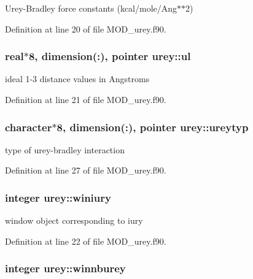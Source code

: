 Urey-\/\-Bradley force constants (kcal/mole/\-Ang$\ast$$\ast$2) 



Definition at line 20 of file M\-O\-D\-\_\-urey.\-f90.

\hypertarget{classurey_a25d40d37004ea0056782407850a7f9e6}{
\subsubsection[{ul}]{\setlength{\rightskip}{0pt plus 5cm}real$\ast$8, dimension(\-:), pointer urey\-::ul}}\label{classurey_a25d40d37004ea0056782407850a7f9e6}


ideal 1-\/3 distance values in Angstroms 



Definition at line 21 of file M\-O\-D\-\_\-urey.\-f90.

\hypertarget{classurey_a2b42e1fe25c411e3bf60b0fbba5471c0}{
\subsubsection[{ureytyp}]{\setlength{\rightskip}{0pt plus 5cm}character$\ast$8, dimension(\-:), pointer urey\-::ureytyp}}\label{classurey_a2b42e1fe25c411e3bf60b0fbba5471c0}


type of urey-\/bradley interaction 



Definition at line 27 of file M\-O\-D\-\_\-urey.\-f90.

\hypertarget{classurey_a06f6e3c501f1deefacf31961bcdf92ad}{
\subsubsection[{winiury}]{\setlength{\rightskip}{0pt plus 5cm}integer urey\-::winiury}}\label{classurey_a06f6e3c501f1deefacf31961bcdf92ad}


window object corresponding to iury 



Definition at line 22 of file M\-O\-D\-\_\-urey.\-f90.

\hypertarget{classurey_a6e00dbd3a8fa551480df4387a3395bea}{
\subsubsection[{winnburey}]{\setlength{\rightskip}{0pt plus 5cm}integer urey\-::winnburey}}\label{classurey_a6e00dbd3a8fa551480df4387a3395bea}


